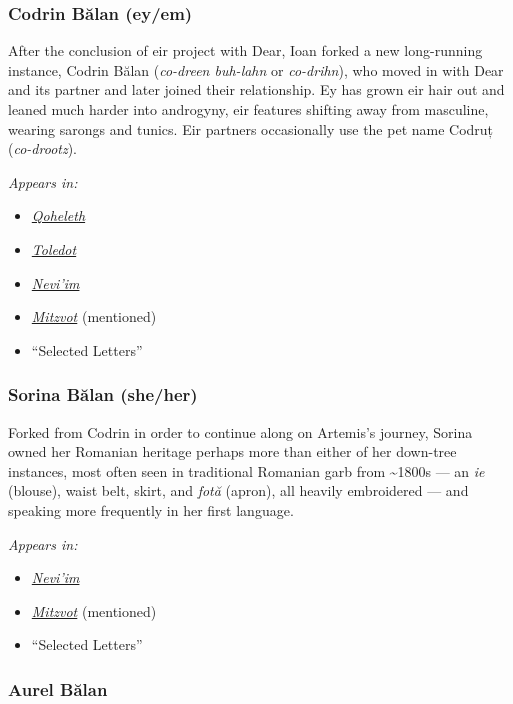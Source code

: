 \subsubsection{Codrin Bălan (ey/em)}

After the conclusion of eir project with Dear, Ioan forked a new long-running instance, Codrin Bălan (\emph{co-dreen buh-lahn} or \emph{co-drihn}), who moved in with Dear and its partner and later joined their relationship. Ey has grown eir hair out and leaned much harder into androgyny, eir features shifting away from masculine, wearing sarongs and tunics. Eir partners occasionally use the pet name Codruț (\emph{co-drootz}).

\emph{Appears in:}

\begin{itemize}
\tightlist
\item
  \href{https://qoheleth.post-self.ink}{\emph{Qoheleth}}
\item
  \href{https://toledot.post-self.ink}{\emph{Toledot}}
\item
  \href{https://neviim.post-self.ink}{\emph{Nevi'im}}
\item
  \href{https://mitzvot.post-self.ink}{\emph{Mitzvot}} (mentioned)
\item
  ``Selected Letters''
\end{itemize}

\subsubsection{Sorina Bălan (she/her)}

Forked from Codrin in order to continue along on Artemis's journey, Sorina owned her Romanian heritage perhaps more than either of her down-tree instances, most often seen in traditional Romanian garb from \textasciitilde1800s --- an \emph{ie} (blouse), waist belt, skirt, and \emph{fotă} (apron), all heavily embroidered --- and speaking more frequently in her first language.

\emph{Appears in:}

\begin{itemize}
\tightlist
\item
  \href{https://neviim.post-self.ink}{\emph{Nevi'im}}
\item
  \href{https://mitzvot.post-self.ink}{\emph{Mitzvot}} (mentioned)
\item
  ``Selected Letters''
\end{itemize}

\subsubsection{Aurel Bălan}

